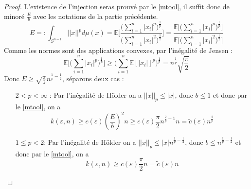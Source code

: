 \documentclass[12pt]{article}
\theoremstyle{definition}
\begin{document}
\begin{proof}
L'existence de l'injection seras prouvé par le \cref{mtool}, il suffit donc de minoré $\frac{E}{b}$ avec les notations de la partie précédente.
\begin{equation*}
	E =: \int_{S^{n-1}}||x||^p d\mu(x) = \mathbb{E}\Bigg[\frac{\big(\sum_{i=1}^{n}|x_i|^p\big)^{\frac{1}{p}}}{\big(\sum_{i=1}^{n}|x_i|^2\big)^{\frac{1}{2}}}\Bigg]= \frac{\mathbb{E}\Bigg[\big(\sum_{i=1}^{n}|x_i|^p\big)^{\frac{1}{p}}\Bigg]}{\mathbb{E}\Bigg[\big(\sum_{i=1}^{n}|x_i|^2\big)^{\frac{1}{2}}\Bigg]}
\end{equation*}
Comme les normes sont des applications convexes, par l'inégalité de Jensen :
\begin{equation*}
	\mathbb{E}\Big[\big(\sum_{i=1}^{n}|x_i|^p\big)^{\frac{1}{p}}\Big]\geq \big(\sum_{i=1}^{n}\mathbb{E}[|x_i|]^p\big)^{\frac{1}{p}}=n^{\frac{1}{p}}\sqrt{\frac{\pi}{2}}
\end{equation*}
Donc $E\geq \sqrt{\frac{\pi}{2}}n^{\frac{1}{p}-\frac{1}{2}}$, séparons deux cas :
\begin{enumerate}
	\item[$2<p<\infty$ :] Par l'inégalité de Hölder on a $||x||_p\leq |x|$, donc $b\leq1$ et donc par le \cref{mtool}, on a 
	\begin{equation*}
	k(\varepsilon,n)\geq c(\varepsilon)(\frac{E}{b})^2 n \geq c(\varepsilon)\frac{\pi}{2}n^{\frac{2}{p}-1}n=\tilde{c}(\varepsilon)n^{\frac{2}{p}} 
	\end{equation*}
	\item[$1\leq p<2$:] Par l'inégalité de Hölder on a $||x||_p\leq |x|n^{\frac{1}{p}-\frac{1}{2}}$, donc $b\leq n^{\frac{1}{p}-\frac{1}{2}}$ et donc par le \cref{mtool}, on a 
	\begin{equation*}
		k(\varepsilon,n)\geq c(\varepsilon) \frac{\pi}{2}n=\tilde{c}(\varepsilon)n
	\end{equation*}
\end{enumerate}
\end{proof}

\nocite{GP}
\nocite{VM2}

\nocite{VMGS}
\printbibliography
\end{document}
